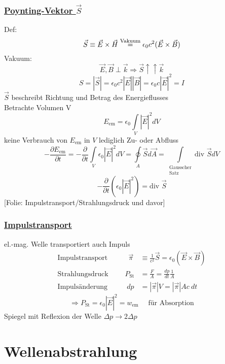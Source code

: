\documentclass[titlepage,12pt,a4paper,ngerman]{report}
\newcommand{\tx}[1]{\textrm{#1}}
\newcommand{\folie}[1]{\color{gray}[Folie: #1]\color{black}}
\begin{document}
\subsubsection{\underline{Poynting-Vektor $ \vec{S} $}}
Def:
$$ \vec{S} \equiv \vec{E} \times \vec{H} \buildrel \tx{Vakuum} \over = \epsilon_0 c^2 (\vec{E} \times \vec{B}) $$
Vakuum:
$$\vec{E} , \vec{B} \perp \vec{k} \Rightarrow \vec{S} \uparrow\uparrow \vec{k}$$
$$S = |\vec{S}| = \epsilon_0 c^2 |\vec{E}| |\vec{B}| = \epsilon_0 c |\vec{E}|^2 = I$$
$ \vec{S} $ beschreibt Richtung und Betrag des Energieflusses\\
Betrachte Volumen V
$$E_{\tx{em}} = \epsilon_0 \int\limits_V |\vec{E}|^2 dV$$
keine Verbrauch von $ E_{\tx{em}} $ in $ V $ lediglich Zu- oder Abfluss
\begin{equation*}
- \frac{\partial E_{\tx{em}}}{\partial t} = - \frac{\partial }{\partial t} \int\limits_V \epsilon_0 |\vec{E}|^2 dV = \oint\limits_A \vec{S} d\vec{A} = \int\limits_{\substack{\tx{Gausscher}\\\tx{Satz}}} \tx{div } \vec{S} dV
\end{equation*}
\begin{equation*}
\boxed{-\frac{\partial}{\partial t} (\epsilon_0 |\vec{E}|^2) = \tx{div }\vec{S} } 
\end{equation*}
\folie{Impulstransport/Strahlungsdruck und davor}
\subsubsection{\underline{Impulstransport}}
el.-mag. Welle transportiert auch Impuls\\


\begin{align*}
\tx{Impulstransport }\qquad \ \ \,\vec{\pi} &\equiv \frac{1}{c^2} \vec{S} = \epsilon_0 (\vec{E} \times \vec{B})\\[5pt]
\tx{Strahlungsdruck }\qquad P_{\tx{St}} &= \frac{F}{A} = \frac{dp}{dt} \frac{1}{A}\\[5pt]
\tx{Impulsänderung }\qquad \ \, dp &= |\vec{\pi}| V = |\vec{\pi}| A c \ dt
\end{align*}
$$\Rightarrow P_{\tx{St}} = \epsilon_0 |\vec{E}|^2 = w_{\tx{em}} \quad \tx{ für Absorption}$$
Spiegel mit Reflexion der Welle $ \Delta p \rightarrow 2 \Delta p $


\section{Wellenabstrahlung}
\end{document}
